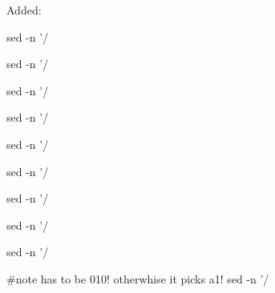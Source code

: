 \newpage






Added:
\begin{quote}

\end{quote}


sed -n '/%

sed -n '/%

sed -n '/%

sed -n '/%

sed -n '/%

sed -n '/%

sed -n '/%

sed -n '/%

sed -n '/%

#note has to be 010! otherwhise it picks a1!
sed -n '/%


